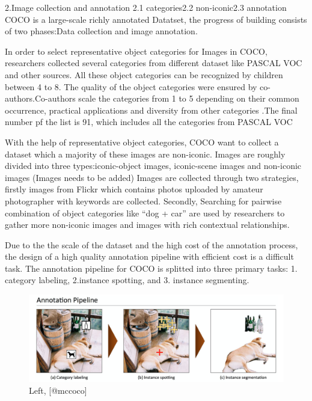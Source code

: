 \documentclass[
]{krantz}
\begin{document}
2.Image collection and annotation 2.1 categories2.2 non-iconic2.3 annotation
COCO is a large-scale richly annotated Datatset, the progress of building consists of two phases:Data collection and image annotation.

In order to select representative object categories for Images in COCO, researchers collected several categories from different dataset like PASCAL VOC and other sources. All these object categories can be recognized by children between 4 to 8. The quality of the object categories were ensured by co-authors.Co-authors scale the categories from 1 to 5 depending on their common occurrence, practical applications and diversity from other categories \citep{mccoco}.The final number pf the list is 91, which includes all the categories from PASCAL VOC

With the help of representative object categories, COCO want to collect a dataset which a majority of these images are non-iconic. Images are roughly divided into three types:iconic-object images, iconic-scene images and non-iconic images\citep{mccoco} (Images needs to be added)
Images are collected through two strategies, firstly images from Flickr which contains photos uploaded by amateur photographer with keywords are collected. Secondly, Searching for pairwise combination of object categories like ``dog + car'' are used by researchers to gather more non-iconic images and images with rich contextual relationships.

Due to the the scale of the dataset and the high cost of the annotation process, the design of a high quality annotation pipeline with efficient cost is a difficult task.
The annotation pipeline for COCO is splitted into three primary tasks: 1. category labeling, 2.instance spotting, and 3. instance segmenting.

\begin{figure}

{\centering \includegraphics[width=1\linewidth]{figures/02-chapter2/2.1 annotation pipeline} 

}

\caption{Left, [@mccoco]}\label{fig:unnamed-chunk-2}
\end{figure}
\end{document}
